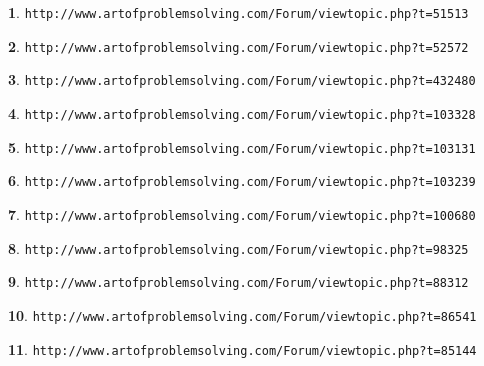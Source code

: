 \documentclass{article}
\theoremstyle{definition}
\newtheorem{s}{}
\begin{document}
	
	
	\begin{s}
		\texttt{http://www.artofproblemsolving.com/Forum/viewtopic.php?t=51513}
	\end{s}
	
	
	
	
	\begin{s}
		\texttt{http://www.artofproblemsolving.com/Forum/viewtopic.php?t=52572}
	\end{s}
	
	
	
	\begin{s}
		\texttt{http://www.artofproblemsolving.com/Forum/viewtopic.php?t=432480}
	\end{s}
	
	
	
	
	\begin{s}
		\texttt{http://www.artofproblemsolving.com/Forum/viewtopic.php?t=103328}
	\end{s}
	
	
	
	
	\begin{s}
		\texttt{http://www.artofproblemsolving.com/Forum/viewtopic.php?t=103131}
	\end{s}
	
	
	
	
	\begin{s}
		\texttt{http://www.artofproblemsolving.com/Forum/viewtopic.php?t=103239}
	\end{s}
	
	
	\begin{s}
		\texttt{http://www.artofproblemsolving.com/Forum/viewtopic.php?t=100680}
	\end{s}
	
	
	\begin{s}
		\texttt{http://www.artofproblemsolving.com/Forum/viewtopic.php?t=98325}
	\end{s}
	
	\begin{s}
		\texttt{http://www.artofproblemsolving.com/Forum/viewtopic.php?t=88312}
	\end{s}
	
	
	\begin{s}
		\texttt{http://www.artofproblemsolving.com/Forum/viewtopic.php?t=86541}
	\end{s}
	
	
	\begin{s}
		\texttt{http://www.artofproblemsolving.com/Forum/viewtopic.php?t=85144}
	\end{s}
	
\end{document}
